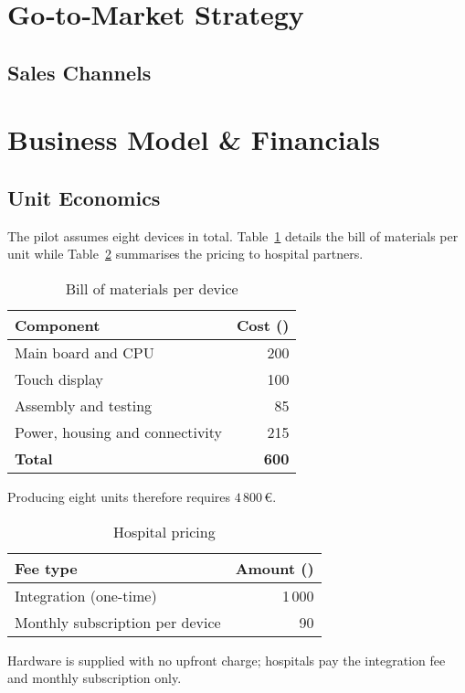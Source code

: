 \documentclass[a4paper,11pt]{article}
\begin{document}
\section{Go‐to‐Market Strategy}
\subsection{Sales Channels}



\section{Business Model \& Financials}
\subsection{Unit Economics}
The pilot assumes eight devices in total. Table~\ref{tab:bom} details the bill of materials per unit while Table~\ref{tab:pricing} summarises the pricing to hospital partners.

\begin{table}[H]
\centering
\caption{Bill of materials per device}
\label{tab:bom}
\begin{tabularx}{\linewidth}{l r}
\toprule
Component & Cost (\texteuro{}) \\
\midrule
Main board and CPU & 200 \\
Touch display & 100 \\
Assembly and testing & 85 \\
Power, housing and connectivity & 215 \\
\midrule
\textbf{Total} & \textbf{600} \\
\bottomrule
\end{tabularx}
\end{table}

Producing eight units therefore requires \(4\,800\,\text{€}\).

\begin{table}[H]
\centering
\caption{Hospital pricing}
\label{tab:pricing}
\begin{tabularx}{\linewidth}{l r}
\toprule
Fee type & Amount (\texteuro{}) \\
\midrule
Integration (one-time) & 1\,000 \\
Monthly subscription per device & 90 \\
\bottomrule
\end{tabularx}
\end{table}

Hardware is supplied with no upfront charge; hospitals pay the integration fee and monthly subscription only.
\end{document}
